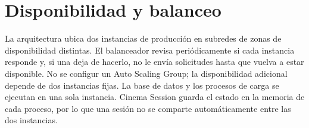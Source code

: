﻿\chapter{Disponibilidad y balanceo}
La arquitectura ubica dos instancias de producción en subredes de zonas de disponibilidad distintas. El balanceador revisa periódicamente si cada instancia responde y, si una deja de hacerlo, no le envía solicitudes hasta que vuelva a estar disponible. No se configur un Auto Scaling Group; la disponibilidad adicional depende de dos instancias fijas.
La base de datos y los procesos de carga se ejecutan en una sola instancia. Cinema Session guarda el estado en la memoria de cada proceso, por lo que una sesión no se comparte automáticamente entre las dos instancias.
